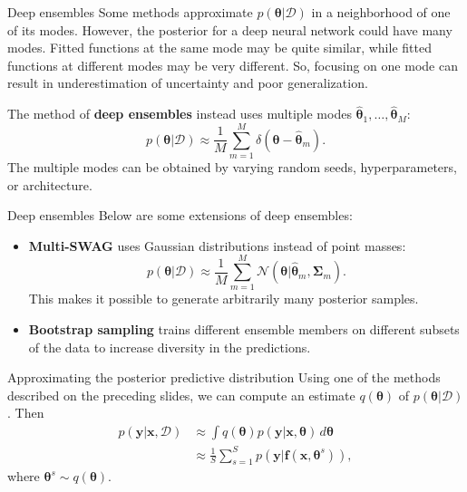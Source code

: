 \documentclass{beamer}
\begin{document}
\begin{frame}{Deep ensembles}
    Some methods approximate $p(\boldsymbol{\theta} | \mathcal{D})$ in a neighborhood of one of its modes. However, the posterior for a deep neural network could have many modes. Fitted functions at the same mode may be quite similar, while fitted functions at different modes may be very different. So, focusing on one mode can result in underestimation of uncertainty and poor generalization.
    
    \medskip
    
    The method of \textbf{deep ensembles} instead uses multiple modes $\hat{\boldsymbol{\theta}}_1, \ldots, \hat{\boldsymbol{\theta}}_M$:
    \[
    p(\boldsymbol{\theta} | \mathcal{D}) \approx \frac{1}{M}\sum_{m = 1}^M \delta(\boldsymbol{\theta} - \hat{\boldsymbol{\theta}}_m).
    \]
    The multiple modes can be obtained by varying random seeds, hyperparameters, or architecture.
\end{frame}

\begin{frame}{Deep ensembles}
    Below are some extensions of deep ensembles:
    \begin{itemize}
        \item \textbf{Multi-SWAG} uses Gaussian distributions instead of point masses:
        \[
        p(\boldsymbol{\theta} | \mathcal{D}) \approx \frac{1}{M}\sum_{m = 1}^M \mathcal{N}(\boldsymbol{\theta} | \hat{\boldsymbol{\theta}}_m, \boldsymbol{\Sigma}_m).
        \]
        This makes it possible to generate arbitrarily many posterior samples.
        \item \textbf{Bootstrap sampling} trains different ensemble members on different subsets of the data to increase diversity in the predictions.
    \end{itemize}
\end{frame}

\begin{frame}{Approximating the posterior predictive distribution}
    Using one of the methods described on the preceding slides, we can compute an estimate $q(\boldsymbol{\theta})$ of $p(\boldsymbol{\theta} | \mathcal{D})$. Then
    \begin{align*}
        p(\boldsymbol{y} | \boldsymbol{x}, \mathcal{D}) &\approx \int q(\boldsymbol{\theta})p(\boldsymbol{y} | \boldsymbol{x}, \boldsymbol{\theta})\,d\boldsymbol{\theta} \\
        &\approx \frac{1}{S}\sum_{s = 1}^S p(\boldsymbol{y} | \boldsymbol{f}(\boldsymbol{x}, \boldsymbol{\theta}^s)),
    \end{align*}
    where $\boldsymbol{\theta}^s \sim q(\boldsymbol{\theta})$.
\end{frame}
\end{document}
